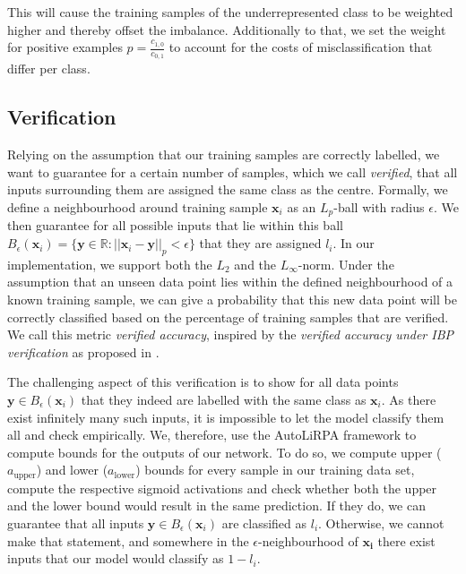 \documentclass[acmsmall,nonacm]{acmart}
\begin{document}
This will cause the training samples of the underrepresented class to be weighted higher and thereby offset the imbalance. Additionally to that, we set the weight for positive examples $p = \frac{c_{1,0}}{c_{0,1}}$ to account for the costs of misclassification that differ per class. 

\subsection{Verification} \label{ssec:verification}

Relying on the assumption that our training samples are correctly labelled, we want to guarantee for a certain number of samples, which we call \textit{verified}, that all inputs surrounding them are assigned the same class as the centre. Formally, we define a neighbourhood around training sample $\mathbf{x}_i$ as an $L_p$-ball with radius $\epsilon$. We then guarantee for all possible inputs that lie within this ball $B_\epsilon(\mathbf{x}_i) = \{\mathbf{y} \in \mathbb{R}: ||\mathbf{x}_i - \mathbf{y}||_p < \epsilon \}$ that they are assigned $l_i$. In our implementation, we support both the $L_2$ and the $L_\infty$-norm. Under the assumption that an unseen data point lies within the defined neighbourhood of a known training sample, we can give a probability that this new data point will be correctly classified based on the percentage of training samples that are verified. %
We call this metric \textit{verified accuracy}, inspired by the \textit{verified accuracy under IBP verification} as proposed in \cite{huang2019achieving}.


The challenging aspect of this verification is to show for all data points $\mathbf{y} \in B_\epsilon(\mathbf{x}_i)$ that they indeed are labelled with the same class as $\mathbf{x}_i$. As there exist infinitely many such inputs, it is impossible to let the model classify them all and check empirically. We, therefore, use the AutoLiRPA framework \cite{xu2020autoLiRPA} to compute bounds for the outputs of our network. To do so, we compute upper ($a_{\text{upper}}$) and lower ($a_{\text{lower}}$) bounds for every sample in our training data set, compute the respective sigmoid activations and check whether both the upper and the lower bound would result in the same prediction. If they do, we can guarantee that all inputs $\mathbf{y} \in B_\epsilon(\mathbf{x}_i)$ are classified as $l_i$. Otherwise, we cannot make that statement, and somewhere in the $\epsilon$-neighbourhood of $\mathbf{x_i}$ there exist inputs that our model would classify as $1-l_i$.
\end{document}
